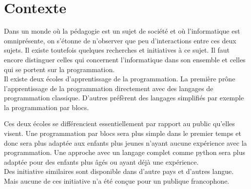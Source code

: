 \section{Contexte}
\label{intro-context}
Dans un monde où la pédagogie est un sujet de société et où l'informatique est omniprésente, on s'étonne de n'observer que peu d'interactions entre ces deux sujets. Il existe toutefois quelques recherches et initiatives à ce sujet. Il faut encore distinguer celles qui concernent l'informatique dans son ensemble et celles qui se portent sur la programmation.\\

Il existe deux écoles d'apprentissage de la programmation. La première prône l'apprentissage de la programmation directement avec des langages de programmation classique. D'autres préfèrent des langages simplifiés par exemple la programmation par blocs. 

Ces deux écoles se différencient essentiellement par rapport au public qu'elles visent. Une programmation par blocs sera plus simple dans le premier temps et donc sera plus adaptée aux enfants plus jeunes n'ayant aucune expérience avec la programmation. Une approche avec un langage complet comme python sera plus adaptée pour des enfants plus âgés ou ayant déjà une expérience.\\

Des initiative similaires sont disponible dans d'autre pays et d'autres langue. Mais aucune de ces initiative n'a été conçue pour un publique francophone.




